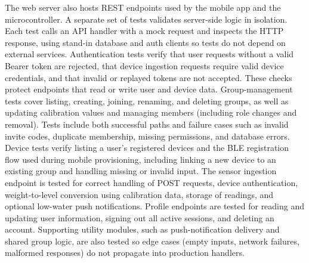 The web server also hosts REST endpoints used by the mobile app and the microcontroller. A separate set of tests validates server-side logic in isolation. 
Each test calls an API handler with a mock request and inspects the HTTP response, using stand-in database and auth clients so tests do not depend on external services.
Authentication tests verify that user requests without a valid Bearer token are rejected, that device ingestion requests require valid device credentials, 
and that invalid or replayed tokens are not accepted. These checks protect endpoints that read or write user and device data.
Group-management tests cover listing, creating, joining, renaming, and deleting groups, as well as updating calibration values and managing members (including role changes and removal). 
Tests include both successful paths and failure cases such as invalid invite codes, duplicate membership, missing permissions, and database errors.
Device tests verify listing a user's registered devices and the BLE registration flow used during mobile provisioning, including linking a new device to an existing group and handling missing or invalid input.
The sensor ingestion endpoint is tested for correct handling of POST requests, device authentication, weight-to-level conversion using calibration data, storage of readings, 
and optional low-water push notifications. Profile endpoints are tested for reading and updating user information, signing out all active sessions, and deleting an account.
Supporting utility modules, such as push-notification delivery and shared group logic, are also tested so edge cases (empty inputs, network failures, malformed responses) do not propagate into production handlers.
